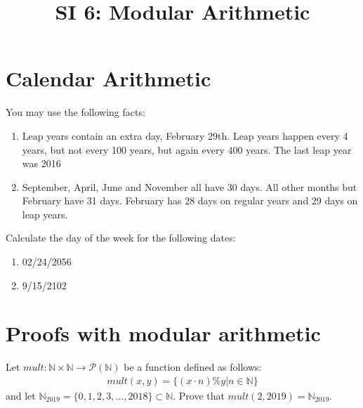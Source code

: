\documentclass[12pt]{article}
\date{}
\author{}
\title{SI 6: Modular Arithmetic}
\begin{document}
	\maketitle
	\section{Calendar Arithmetic}
	You may use the following facts:
	
	\begin{enumerate}
		\item Leap years contain an extra day, February 29th. Leap years happen every 4 years, but not every 100 years, but again every 400 years. The last leap year was 2016
		\item September, April, June and November all have 30 days. All other months but February have 31 days. February has 28 days on regular years and 29 days on leap years.		
	\end{enumerate}
	Calculate the day of the week for the following dates:
	\begin{enumerate}
		\item 02/24/2056
		\item 9/15/2102
	\end{enumerate}
\section{Proofs with modular arithmetic}
Let $mult: \mathbb{N}\times\mathbb{N} \to \mathscr{P}(\mathbb{N})$ be a function defined as follows:
\begin{align*}
	mult(x,y) = \{(x\cdot n)\%y | n \in \mathbb{N}\}
\end{align*}
and let $\mathbb{N}_{2019} = \{0,1,2,3,...,2018\} \subset \mathbb{N}$. Prove  that $mult(2,2019) = \mathbb{N}_{2019}$.
\end{document}
